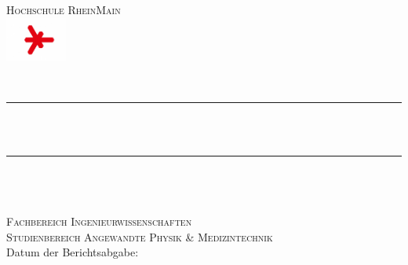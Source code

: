 \begin{titlepage}
    \newcommand{\HRule}{\rule{\linewidth}{0.5mm}}
    \centering
    \textsc{\Large Hochschule RheinMain \\
        \includegraphics[width=0.15\textwidth]{logo-hsrm}\\[1cm]}
    
    \textsc{\LARGE \titelLV}\\[0.5cm]
    \HRule\\[0.4cm]
    {\huge\bfseries \untertitela}\\[0.6cm]
    \HRule\\[1.5cm] 
    
    \large \textsc{\nameA}\\[0.5cm]

    \vfill
    \textsc{\Large \lvleitung}\\[0.5cm]
    \textsc{\Large Fachbereich Ingenieurwissenschaften}\\[0.5cm]
    \textsc{\large Studienbereich Angewandte Physik \& Medizintechnik}\\[0.5cm]

    \vfill
    \hspace{0.4cm} {\large Datum der Berichtsabgabe: \datum}
\end{titlepage}
